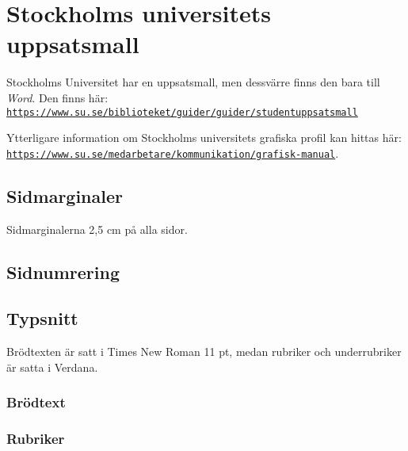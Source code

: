 
\section{Stockholms universitets uppsatsmall}
\label{utseende}

Stockholms Universitet har en uppsatsmall, men dessvärre finns den bara till
\textit{Word}. Den finns här: \texttt{\href{https://www.su.se/biblioteket/guider/guider/studentuppsatsmall}{https://\linebreak[0]{}www.su.se/\linebreak[0]{}biblioteket/\linebreak[0]{}guider/\linebreak[0]{}guider/\linebreak[0]{}studentuppsatsmall}}

Ytterligare information om Stockholms universitets grafiska profil kan hittas här:
\texttt{\href{https://www.su.se/medarbetare/kommunikation/grafisk-manual}{https://\linebreak[0]{}www.su.se/medarbetare/\linebreak[0]{}kommunikation/\linebreak[0]{}grafisk-manual}}.


\subsection{Sidmarginaler}

Sidmarginalerna 2,5 cm på alla sidor.


\subsection{Sidnumrering}


\subsection{Typsnitt}

Brödtexten är satt i Times New Roman 11 pt, medan rubriker och underrubriker är
satta i Verdana.


\subsubsection{Brödtext}


\subsubsection{Rubriker}

